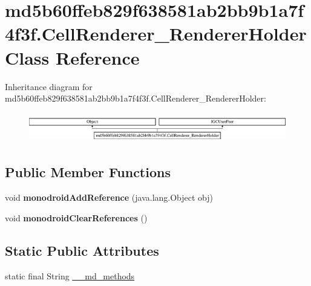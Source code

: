 \hypertarget{classmd5b60ffeb829f638581ab2bb9b1a7f4f3f_1_1CellRenderer__RendererHolder}{}\section{md5b60ffeb829f638581ab2bb9b1a7f4f3f.\+Cell\+Renderer\+\_\+\+Renderer\+Holder Class Reference}
\label{classmd5b60ffeb829f638581ab2bb9b1a7f4f3f_1_1CellRenderer__RendererHolder}
Inheritance diagram for md5b60ffeb829f638581ab2bb9b1a7f4f3f.\+Cell\+Renderer\+\_\+\+Renderer\+Holder\+:\begin{figure}[H]
\begin{center}
\leavevmode
\includegraphics[height=1.314554cm]{classmd5b60ffeb829f638581ab2bb9b1a7f4f3f_1_1CellRenderer__RendererHolder}
\end{center}
\end{figure}
\subsection*{Public Member Functions}
\begin{DoxyCompactItemize}
\item 
\mbox{\label{classmd5b60ffeb829f638581ab2bb9b1a7f4f3f_1_1CellRenderer__RendererHolder_a9dfe45e5cb1c36ddbfe31a4068cb0394}} 
void {\bfseries monodroid\+Add\+Reference} (java.\+lang.\+Object obj)
\item 
\mbox{\label{classmd5b60ffeb829f638581ab2bb9b1a7f4f3f_1_1CellRenderer__RendererHolder_a21da82531ee5902ab97748aa2bb500c6}} 
void {\bfseries monodroid\+Clear\+References} ()
\end{DoxyCompactItemize}
\subsection*{Static Public Attributes}
\begin{DoxyCompactItemize}
\item 
static final String \hyperlink{classmd5b60ffeb829f638581ab2bb9b1a7f4f3f_1_1CellRenderer__RendererHolder_a4578cafbc2b812d71e4d477b6ee135b3}{\+\_\+\+\_\+md\+\_\+methods}
\end{DoxyCompactItemize}
